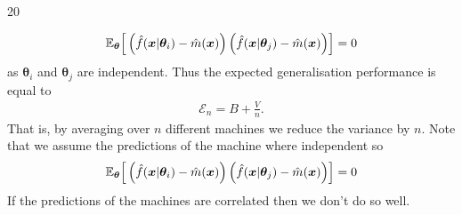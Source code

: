 \documentclass{sotonExamBoxes}    %
\newcommand{\ml}[1]{\hat{f}(\bm{x}|\bm{\theta}_{#1})}
\newcommand{\mm}{\hat{m}(\bm{x})}
\begin{document}
\begin{question}{20}
\begin{qparts}
\begin{answer}
\begin{align*}
         \av[\bm{\theta}]{\bra{\ml{i}-\mm}\bra{\ml{j}-\mm }} = 0
      \end{align*}
      as $\bm{\theta}_i$ and $\bm{\theta}_j$ are independent.  Thus the expected
      generalisation performance is equal to
      \begin{align*}
        \mathcal{E}_n = B + \frac{V}{n}.
      \end{align*}
      That is, by averaging over $n$ different machines we reduce the
      variance by $n$.  Note that we assume the predictions of the
      machine where independent so
      \begin{align*}
        \av[\bm{\theta}]{\bra{\ml{i}-\mm}\bra{\ml{j}-\mm }} = 0
      \end{align*}
      If the predictions of the machines are correlated then we don't
      do so well.
     \end{answer}
   \end{qparts}
\end{question}
\end{document}
